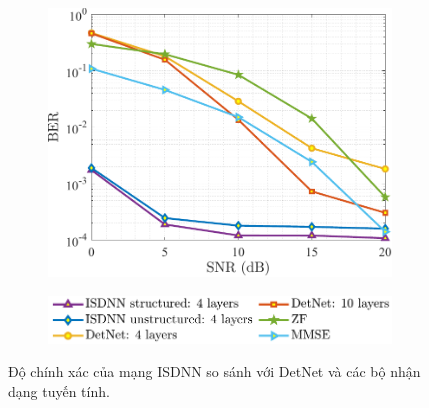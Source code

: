 \begin{figure}[t]
    \centering
    \begin{subfigure}{\linewidth}
        \includegraphics[width=\linewidth]{figures/performance_1.pdf}
    \end{subfigure}
    \hfill
    \begin{subfigure}{\linewidth}
        \centering
        \includegraphics[width=.8\linewidth]{figures/lg_performance_1.pdf}
    \end{subfigure}
    \caption{Độ chính xác của mạng ISDNN so sánh với DetNet và các bộ nhận dạng tuyến tính.}
    \label{fig:isdnn}
\end{figure}

